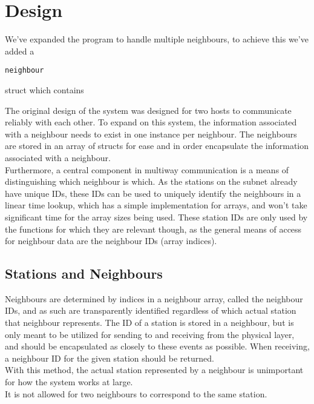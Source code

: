\section{Design}
We've expanded the program to handle multiple neighbours,
to achieve this we've added a
\begin{lstlisting}
neighbour
\end{lstlisting}
struct which contains


The original design of the system was designed for two hosts to communicate reliably with each other. To expand on this system, the information associated with a neighbour needs to exist in one instance per neighbour. The neighbours are stored in an array of structs for ease and in order encapsulate the information associated with a neighbour.\\
Furthermore, a central component in multiway communication is a means of distinguishing which neighbour is which. As the stations on the subnet already have unique IDs, these IDs can be used to uniquely identify the neighbours in a linear time lookup, which has a simple implementation for arrays, and won't take significant time for the array sizes being used. These station IDs are only used by the functions for which they are relevant though, as the general means of access for neighbour data are the neighbour IDs (array indices).

\subsection{Stations and Neighbours}
Neighbours are determined by indices in a neighbour array, called the neighbour IDs, and as such are transparently identified regardless of which actual station that neighbour represents. The ID of a station is stored in a neighbour, but is only meant to be utilized for sending to and receiving from the physical layer, and should be encapsulated as closely to these events as possible. When receiving, a neighbour ID for the given station should be returned.\\
With this method, the actual station represented by a neighbour is unimportant for how the system works at large.\\
It is not allowed for two neighbours to correspond to the same station.

% 

